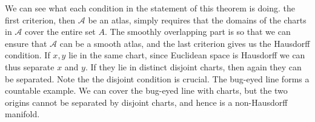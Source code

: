 \documentclass{article}                                                        %
\begin{document}
            We can see what each condition in the statement of this theorem is
            doing. the first criterion, then $\mathcal{A}$ be an atlas, simply
            requires that the domains of the charts in $\mathcal{A}$ cover the
            entire set $A$. The smoothly overlapping part is so that we can
            ensure that $\mathcal{A}$ can be a smooth atlas, and the last
            criterion gives us the Hausdorff condition. If $x,y$ lie in the same
            chart, since Euclidean space is Hausdorff we can thus separate $x$
            and $y$. If they lie in distinct disjoint charts, then again they
            can be separated. Note the the disjoint condition is crucial. The
            bug-eyed line forms a countable example. We can cover the bug-eyed
            line with charts, but the two origins cannot be separated by
            disjoint charts, and hence is a non-Hausdorff manifold.
\end{document}
